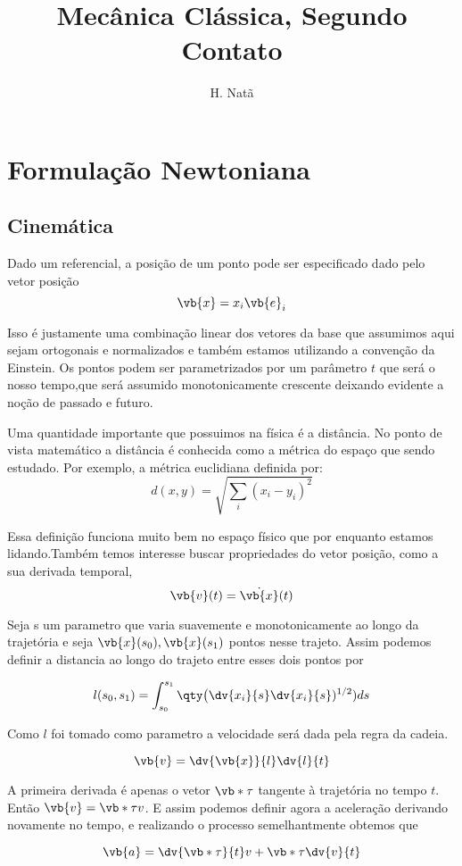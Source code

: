 \documentclass{article}
\title{Mecânica Clássica, Segundo Contato}
\author{H. Natã}
\begin{document}
 \maketitle
 \section{Formulação Newtoniana}
 \subsection{Cinemática}
 
 Dado um referencial, a posição de um ponto pode ser especificado dado pelo vetor posição 
 $$\vb{x}=x_i\vb{e}_i$$
 
 Isso é justamente uma combinação linear dos vetores da base que assumimos aqui sejam ortogonais e normalizados e também estamos utilizando a convenção da Einstein. Os pontos podem ser parametrizados por um parâmetro $t$ que será o nosso tempo,que será assumido monotonicamente crescente deixando evidente a noção de passado e futuro. 
 
 Uma quantidade importante que possuimos na física é a distância. No ponto de vista matemático a distância é conhecida como a métrica do espaço que sendo estudado. Por exemplo, a métrica euclidiana definida por:
 $$d(x,y)=\sqrt{\sum_{i}(x_i-y_i)^2}$$
 
 Essa definição funciona muito bem no espaço físico que por enquanto estamos lidando.Também temos interesse buscar propriedades do vetor posição, como a sua derivada temporal, 
 $$\vb{v}(t)=\dot{\vb{x}}(t)$$
 
 
 Seja s um parametro que varia suavemente e monotonicamente ao longo da trajetória  e seja $\vb{x}(s_0),\vb{x}(s_1)$ pontos nesse trajeto. Assim podemos definir a distancia ao longo do trajeto entre esses dois pontos por
 

$$l(s_0,s_1)= \int_{s_0}^{s_1} \qty\big(\dv{x_i}{s}\dv{x_i}{s})^{1/2}) ds$$
 
 
 Como $l$ foi tomado como parametro a velocidade será dada pela regra da cadeia.
 
 $$\vb{v}=\dv{\vb{x}}{l}\dv{l}{t}$$
 
 A primeira derivada é apenas o vetor $\vb*{\tau}$ tangente à trajetória no tempo $t$. Então $\vb{v}=\vb*{\tau}v$. E assim podemos definir agora a aceleração derivando novamente no tempo, e realizando o processo semelhantmente obtemos que
 
 $$\vb{a}=\dv{\vb*{\tau}}{t}v+\vb*{\tau} \dv{v}{t}$$
 
\end{document}
